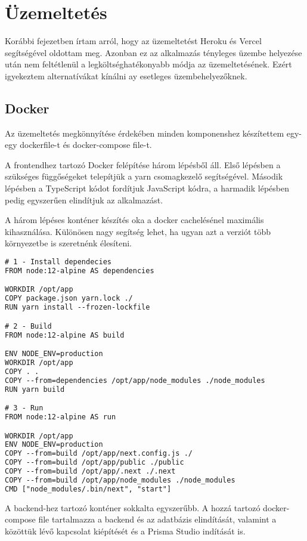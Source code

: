 \chapter{Üzemeltetés}
Korábbi fejezetben írtam arról, hogy az üzemeltetést Heroku és Vercel segítségével oldottam meg.
Azonban ez az alkalmazás tényleges üzembe helyezése után nem feltétlenül a legköltséghatékonyabb módja az üzemeltetésének.
Ezért igyekeztem alternatívákat kínálni ay esetleges üzembehelyezőknek.

\section{Docker}
Az üzemeltetés megkönnyítése érdekében minden komponenshez készítettem egy-egy dockerfile-t és docker-compose file-t.

A frontendhez tartozó Docker felépítése három lépésből áll. Első lépésben a szükséges függőségeket telepítjük a yarn csomagkezelő segítségével.
Második lépésben a TypeScript kódot fordítjuk JavaScript kódra, a harmadik lépésben pedig egyszerűen elindítjuk az alkalmazást.

A három lépéses konténer készítés oka a docker cachelésénel maximális kihasználása.
Különösen nagy segítség lehet, ha ugyan azt a verziót több környezetbe is szeretnénk élesíteni.

\begin{lstlisting}[language=TeX, caption=Frontend Dockerfile]
# 1 - Install dependecies
FROM node:12-alpine AS dependencies

WORKDIR /opt/app
COPY package.json yarn.lock ./
RUN yarn install --frozen-lockfile

# 2 - Build
FROM node:12-alpine AS build

ENV NODE_ENV=production
WORKDIR /opt/app
COPY . .
COPY --from=dependencies /opt/app/node_modules ./node_modules
RUN yarn build

# 3 - Run
FROM node:12-alpine AS run

WORKDIR /opt/app
ENV NODE_ENV=production
COPY --from=build /opt/app/next.config.js ./
COPY --from=build /opt/app/public ./public
COPY --from=build /opt/app/.next ./.next
COPY --from=build /opt/app/node_modules ./node_modules
CMD ["node_modules/.bin/next", "start"]
\end{lstlisting}

A backend-hez tartozó konténer sokkalta egyszerűbb. 
A hozzá tartozó docker-compose file tartalmazza a backend és az adatbázis elindítását, valamint a közöttük lévő kapcsolat kiépítését és a Prisma Studio indítását is.

